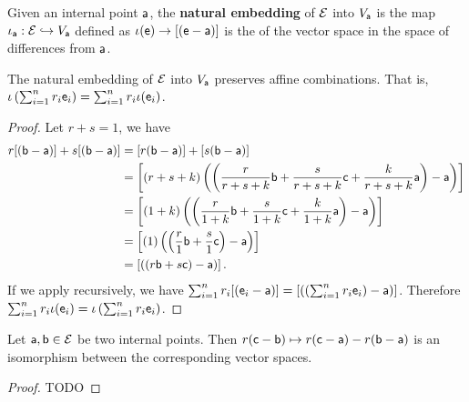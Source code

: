 \begin{mathSection}
	\begin{defn}
		Given an internal point $\ens[a]$, the \textbf{natural embedding} of $\Ens$ into $V_{\ens[a]}$ is the map $\iota_{\ens[a]} : \Ens \hookrightarrow V_{\ens[a]}$ defined as $\iota(\ens) \to [(\ens - \ens[a])]$ is the  of the vector space in the space of differences from $\ens[a]$.
	\end{defn}
	
	\begin{coro}
		The natural embedding of $\Ens$ into $V_{\ens[a]}$ preserves affine combinations. That is, $\iota\left(\sum_{i=1}^n r_i \ens_i \right) = \sum_{i=1}^n r_i \iota(\ens_i)$.
	\end{coro}
	
	\begin{proof}
		Let $r+s=1$, we have
		\begin{equation}
			\begin{aligned}
				r[(\ens[b] - \ens[a])] +s[(\ens[b] - \ens[a])] &= [r(\ens[b] - \ens[a])] +[s(\ens[b] - \ens[a])] \\
				&= \left[(r+s+k) \left(\left(\frac{r}{r+s+k}\ens[b] + \frac{s}{r+s+k} \ens[c] +\frac{k}{r+s+k} \ens[a] \right) - \ens[a]\right)\right] \\
				&= \left[(1+k) \left(\left(\frac{r}{1+k}\ens[b] + \frac{s}{1+k} \ens[c] +\frac{k}{1+k} \ens[a] \right) - \ens[a]\right)\right] \\
				&= \left[(1) \left(\left(\frac{r}{1}\ens[b] + \frac{s}{1} \ens[c] \right) - \ens[a]\right)\right] \\
				&= \left[\left(\left(r\ens[b] + s \ens[c] \right) - \ens[a]\right)\right].
			\end{aligned}
		\end{equation}
		If we apply recursively, we have $\sum_{i=1}^{n} r_i [(\ens_i - \ens[a])] = \left[\left(\left(\sum_{i=1}^{n}r_i \ens_i\right) - \ens[a]\right)\right]$. Therefore $\sum_{i=1}^n r_i \iota(\ens_i) = \iota\left(\sum_{i=1}^n r_i \ens_i \right)$.
	\end{proof}
	
	\begin{prop}
		Let $\ens[a],\ens[b] \in \Ens$ be two internal points. Then $r(\ens[c] - \ens[b]) \mapsto r(\ens[c]-\ens[a]) - r(\ens[b]-\ens[a])$ is an isomorphism between the corresponding vector spaces.
	\end{prop}
	
	\begin{proof}
		TODO
	\end{proof}
\end{mathSection}

